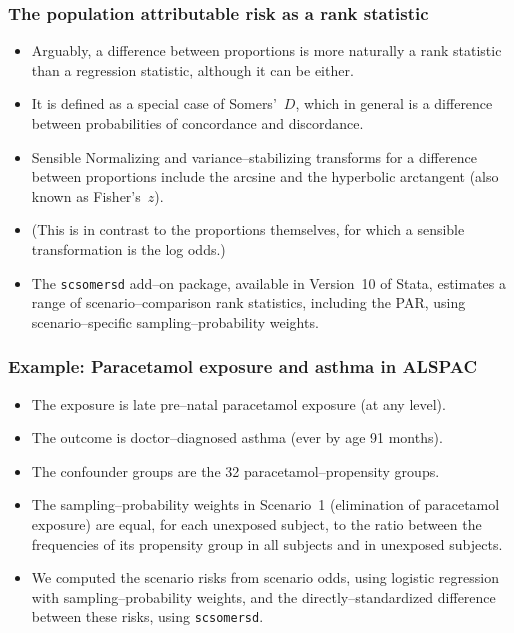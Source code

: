 \documentclass[11pt]{beamer}
\begin{document}
\begin{frame}
\frametitle{The population attributable risk as a rank statistic}

\begin{itemize}

\item<2-> Arguably, a difference between proportions is more naturally a rank statistic than a regression statistic,
although it can be either.

\item<3-> It is defined as a special case of Somers'~$D$,
which in general is a difference between probabilities of concordance and discordance.

\item<4-> Sensible Normalizing and variance--stabilizing transforms for a difference between proportions
include the arcsine and the hyperbolic arctangent (also known as Fisher's~$z$).

\item<5-> (This is in contrast to the proportions themselves,
for which a sensible transformation is the log odds.)

\item<6-> The \texttt{scsomersd} add--on package, available in Version~10 of Stata,
estimates a range of scenario--comparison rank statistics, including the PAR,
using scenario--specific sampling--probability weights.

\end{itemize}

\end{frame}

\begin{frame}
\frametitle{Example: Paracetamol exposure and asthma in ALSPAC}

\begin{itemize}

\item<2-> The exposure is late pre--natal paracetamol exposure (at any level).

\item<3-> The outcome is doctor--diagnosed asthma (ever by age 91 months).

\item<4-> The confounder groups are the 32 paracetamol--propensity groups.

\item<5-> The sampling--probability weights in Scenario~1 (elimination of paracetamol exposure)
are equal, for each unexposed subject, to the ratio between the frequencies of its propensity group
in all subjects and in unexposed subjects.

\item<6-> We computed the scenario risks from scenario odds,
using logistic regression with sampling--probability weights,
and the directly--standardized difference between these risks,
using \texttt{scsomersd}.

\end{itemize}

\end{frame}
\end{document}
